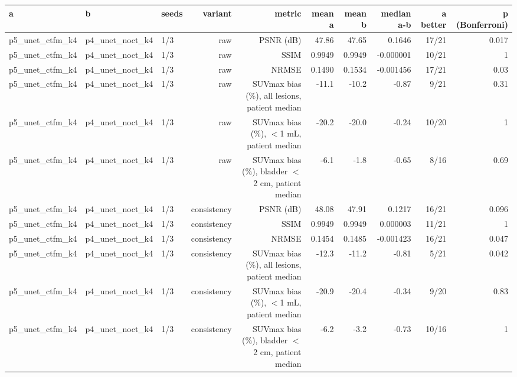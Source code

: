\begin{tabular}{lllrrrrrrr}
\toprule
a & b & seeds & variant & metric & mean a & mean b & median a-b & a better & p (Bonferroni) \\
\midrule
p5\_unet\_ctfm\_k4 & p4\_unet\_noct\_k4 & 1/3 & raw & PSNR (dB) & 47.86 & 47.65 & 0.1646 & 17/21 & 0.017 \\
p5\_unet\_ctfm\_k4 & p4\_unet\_noct\_k4 & 1/3 & raw & SSIM & 0.9949 & 0.9949 & -0.000001 & 10/21 & 1 \\
p5\_unet\_ctfm\_k4 & p4\_unet\_noct\_k4 & 1/3 & raw & NRMSE & 0.1490 & 0.1534 & -0.001456 & 17/21 & 0.03 \\
p5\_unet\_ctfm\_k4 & p4\_unet\_noct\_k4 & 1/3 & raw & SUVmax bias (\%), all lesions, patient median & -11.1 & -10.2 & -0.87 & 9/21 & 0.31 \\
p5\_unet\_ctfm\_k4 & p4\_unet\_noct\_k4 & 1/3 & raw & SUVmax bias (\%), $<$1 mL, patient median & -20.2 & -20.0 & -0.24 & 10/20 & 1 \\
p5\_unet\_ctfm\_k4 & p4\_unet\_noct\_k4 & 1/3 & raw & SUVmax bias (\%), bladder $<$2 cm, patient median & -6.1 & -1.8 & -0.65 & 8/16 & 0.69 \\
p5\_unet\_ctfm\_k4 & p4\_unet\_noct\_k4 & 1/3 & consistency & PSNR (dB) & 48.08 & 47.91 & 0.1217 & 16/21 & 0.096 \\
p5\_unet\_ctfm\_k4 & p4\_unet\_noct\_k4 & 1/3 & consistency & SSIM & 0.9949 & 0.9949 & 0.000003 & 11/21 & 1 \\
p5\_unet\_ctfm\_k4 & p4\_unet\_noct\_k4 & 1/3 & consistency & NRMSE & 0.1454 & 0.1485 & -0.001423 & 16/21 & 0.047 \\
p5\_unet\_ctfm\_k4 & p4\_unet\_noct\_k4 & 1/3 & consistency & SUVmax bias (\%), all lesions, patient median & -12.3 & -11.2 & -0.81 & 5/21 & 0.042 \\
p5\_unet\_ctfm\_k4 & p4\_unet\_noct\_k4 & 1/3 & consistency & SUVmax bias (\%), $<$1 mL, patient median & -20.9 & -20.4 & -0.34 & 9/20 & 0.83 \\
p5\_unet\_ctfm\_k4 & p4\_unet\_noct\_k4 & 1/3 & consistency & SUVmax bias (\%), bladder $<$2 cm, patient median & -6.2 & -3.2 & -0.73 & 10/16 & 1 \\
\bottomrule
\end{tabular}

